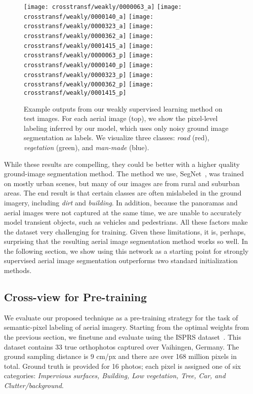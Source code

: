 \begin{figure}
	\centering
	\texttt{[image: crosstransf/weakly/0000063\_a]} \hfill
	\texttt{[image: crosstransf/weakly/0000140\_a]} \hfill
	\texttt{[image: crosstransf/weakly/0000323\_a]} \hfill
	\texttt{[image: crosstransf/weakly/0000362\_a]} \hfill
	\texttt{[image: crosstransf/weakly/0001415\_a]}
  \newline
	\texttt{[image: crosstransf/weakly/0000063\_p]} \hfill
	\texttt{[image: crosstransf/weakly/0000140\_p]} \hfill
	\texttt{[image: crosstransf/weakly/0000323\_p]} \hfill
	\texttt{[image: crosstransf/weakly/0000362\_p]} \hfill
	\texttt{[image: crosstransf/weakly/0001415\_p]}
  \caption{Example outputs from our weakly supervised learning method
    on test images.  For each aerial image (top), we show the
    pixel-level labeling inferred by our model, which uses only noisy
    ground image segmentation as labels.  We visualize three classes:
    {\em road} (red), {\em vegetation} (green), and {\em man-made} 
    (blue).}
  \label{fig:weakly}
\end{figure}

While these results are compelling, they could be better with a higher
quality ground-image segmentation method.  The method we use,
SegNet~\cite{badrinarayanan2015segnet}, was trained on mostly urban
scenes, but many of our images are from rural and suburban areas.  The
end result is that certain classes are often mislabeled in the ground
imagery, including {\em dirt} and {\em building}.  In addition,
because the panoramas and aerial images were not captured at the same
time, we are unable to accurately model transient objects, such as
vehicles and pedestrians. All these factors make the dataset very
challenging for training. Given these limitations, it is, perhaps,
surprising that the resulting aerial image segmentation method works
so well.  In the following section, we show using this network as a
starting point for strongly supervised aerial image segmentation
outperforms two standard initialization methods. 

\subsection{Cross-view for Pre-training}

We evaluate our proposed technique as a pre-training strategy for the
task of semantic-pixel labeling of aerial imagery.  Starting from
the optimal weights from the previous section, we finetune and
evaluate using the ISPRS dataset~\cite{rottensteiner2013isprs}.
This dataset contains 33 true orthophotos captured over
Vaihingen, Germany.  The ground sampling distance is 9 cm/px and there
are over 168 million pixels in total.  Ground truth is provided for 16
photos; each pixel is assigned one of six categories: {\em Impervious
surfaces, Building, Low vegetation, Tree, Car, and Clutter/background}.

